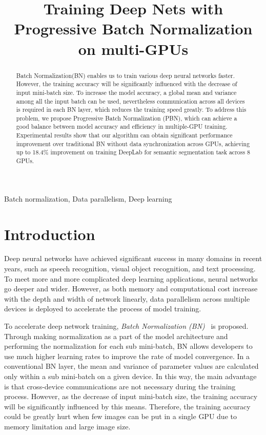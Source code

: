 \documentclass{llncs}
\begin{document}
\title{Training Deep Nets with Progressive Batch Normalization on multi-GPUs}

\author{}
\institute{}
\maketitle

\begin{abstract}
Batch Normalization(BN) enables us to train various deep neural networks faster. However, the training accuracy will be significantly influenced with the decrease of input mini-batch size. 
To increase the model accuracy, a global mean and variance
among all the input batch can be used, nevertheless communication
across all devices is required in each BN layer, which reduces the
training speed greatly.
To address this problem, we propose Progressive Batch Normalization (PBN), which can achieve a good balance between model accuracy and efficiency in multiple-GPU training. Experimental results show that our algorithm can obtain significant performance improvement over traditional BN without data synchronization across GPUs, achieving up to 18.4\% improvement on training DeepLab for semantic segmentation task across 8 GPUs.
\end{abstract}

\begin{keywords}
Batch normalization, Data parallelism, Deep learning
\end{keywords}
\section{Introduction}

Deep neural networks have achieved significant success in many domains in recent years, such as speech recognition, visual object recognition, and text processing. To meet more and more complicated deep learning applications, neural networks go deeper and wider. However, as both memory and computational cost increase with the depth and width of network linearly, data parallelism across multiple devices is deployed to accelerate the process of model training.

To accelerate deep network training, \emph{Batch Normalization (BN)}~\cite{ioffe2015batch} is proposed. Through making normalization as a part of the model architecture and performing the normalization for each sub mini-batch, BN allows developers to use much higher learning rates to improve the rate of model convergence. In a conventional BN layer, the mean and variance of parameter values are calculated only within a sub mini-batch on a given device. In this way, the main advantage is that cross-device communications are not necessary during the training process. However, as the decrease of input mini-batch size, the training accuracy will be significantly influenced by this means. Therefore, the training accuracy could be greatly hurt when few images can be put in a single GPU due to memory limitation and large image size.
\end{document}
